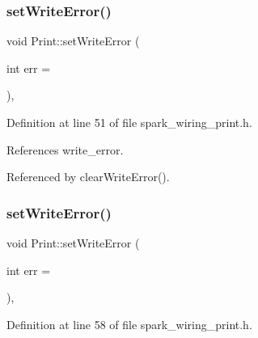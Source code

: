 \mbox{\label{class_print_a46656410e23c0ec14d7a01b38b3b6f00}} 
\subsubsection{\texorpdfstring{set\+Write\+Error()}{setWriteError()}\hspace{0.1cm}{\footnotesize\ttfamily [1/2]}}
{\footnotesize\ttfamily void Print\+::set\+Write\+Error (\begin{DoxyParamCaption}\item[{int}]{err = {} }\end{DoxyParamCaption})\hspace{0.3cm}{\ttfamily [inline]}, {\ttfamily [protected]}}



Definition at line 51 of file spark\+\_\+wiring\+\_\+print.\+h.



References write\+\_\+error.



Referenced by clear\+Write\+Error().

\mbox{\label{class_print_a46656410e23c0ec14d7a01b38b3b6f00}} 
\subsubsection{\texorpdfstring{set\+Write\+Error()}{setWriteError()}\hspace{0.1cm}{\footnotesize\ttfamily [2/2]}}
{\footnotesize\ttfamily void Print\+::set\+Write\+Error (\begin{DoxyParamCaption}\item[{int}]{err = {} }\end{DoxyParamCaption})\hspace{0.3cm}{\ttfamily [inline]}, {\ttfamily [protected]}}



Definition at line 58 of file spark\+\_\+wiring\+\_\+print.\+h.

\mbox{\label{class_print_a5be30d49adae2406a270c29ba9a3e0a3}} 
